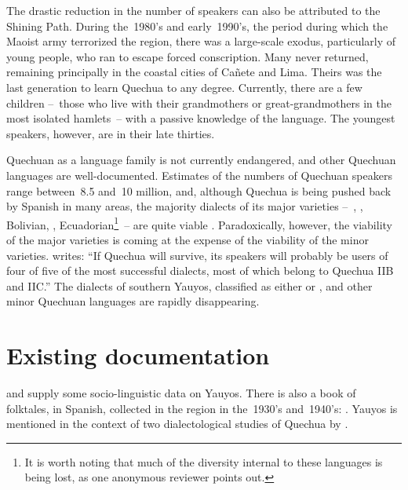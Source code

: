 The drastic reduction in the number of speakers can also be attributed to the Shining Path. During the~1980’s and early~1990’s, the period during which the Maoist army terrorized the region, there was a large-scale exodus, particularly of young people, who ran to escape forced conscription. Many never returned, remaining principally in the coastal cities of Cañete and Lima. Theirs was the last generation to learn Quechua to any degree. Currently, there are a few children --~those who live with their grandmothers or great-grandmothers in the most isolated hamlets~-- with a passive knowledge of the language. The youngest speakers, however, are in their late thirties.

Quechuan as a language family is not currently endangered, and other Quechuan languages are well-documented. Estimates of the numbers of Quechuan speakers range between~8.5 and~10 million, and, although Quechua is being pushed back by Spanish in many areas, the majority dialects of its major varieties --~, , Bolivian, , Ecuadorian\footnote{It is worth noting that much of the diversity internal to these languages is being lost, as one anonymous reviewer points out.}~-- are quite viable \citep[168]{Adelaar04}. Paradoxically, however, the viability of the major varieties is coming at the expense of the viability of the minor varieties. \citet[14]{Adelaar08} writes: “If Quechua will survive, its speakers will probably be users of four of five of the most successful dialects, most of which belong to Quechua IIB and IIC.” The dialects of southern Yauyos, classified as either \QI{} or \QIIA, and other minor Quechuan languages are rapidly disappearing.

\section{Existing documentation}\label{sec:documentation}
\citet{Echerd74} and \citet{Brougere92} supply some socio-linguistic data on Yauyos. There is also a book of folktales, in Spanish, collected in the region in the~1930’s and~1940’s:  \citep{Varilla}. Yauyos is mentioned in the context of two dialectological studies of Quechua by \citet{Torero68,Torero74}.

